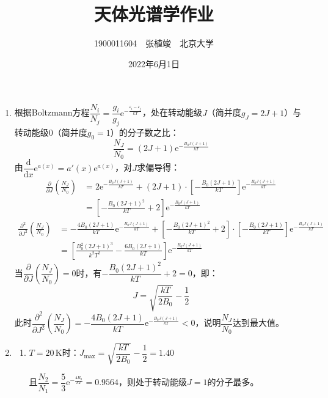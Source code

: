 \documentclass[a4paper]{article}
\renewcommand\epsilon\varepsilon
\begin{document}
\title{\textbf{天体光谱学作业}}
\author{1900011604\ \ 张植竣\ \ 北京大学}
\date{2022年6月1日}
\maketitle

\begin{enumerate}

    \item[1.]
    根据Boltzmann方程$\dfrac{N_i}{N_j} = \dfrac{g_i}{g_j} \mathrm{e}^{-\tfrac{\epsilon_i - \epsilon_j}{kT}}$，处在转动能级$J$（简并度$g_J=2J+1$）与转动能级$0$（简并度$g_0=1$）的分子数之比：
    \[
        \frac{N_J}{N_0} = (2J+1)\mathrm{e}^{-\tfrac{B_0 J(J+1)}{kT}}
    \]
    由$\dfrac{\mathrm{d}}{\mathrm{d}x}\mathrm{e}^{a(x)} = a'(x)\mathrm{e}^{a(x)}$，对$J$求偏导得：
    \begin{align*}
        \frac{\partial}{\partial J}\left(\frac{N_J}{N_0}\right)
        &= 2\mathrm{e}^{-\tfrac{B_0 J(J+1)}{kT}} + (2J+1) \cdot \left[-\frac{B_0(2J+1)}{kT}\right]\mathrm{e}^{-\tfrac{B_0 J(J+1)}{kT}} \\
        &= \left[-\frac{B_0(2J+1)^2}{kT} + 2\right]\mathrm{e}^{-\tfrac{B_0 J(J+1)}{kT}}
    \end{align*}
    \begin{align*}
        \frac{\partial^2}{\partial J^2}\left(\frac{N_J}{N_0}\right)
        &= -\frac{4B_0(2J+1)}{kT}\mathrm{e}^{-\tfrac{B_0 J(J+1)}{kT}} + \left[-\frac{B_0(2J+1)^2}{kT} + 2\right] \cdot \left[-\frac{B_0(2J+1)}{kT}\right]\mathrm{e}^{-\tfrac{B_0 J(J+1)}{kT}} \\
        &= \left[\frac{B_0 ^2 (2J+1)^3}{k^2 T^2} - \frac{6B_0(2J+1)}{kT}\right]\mathrm{e}^{-\tfrac{B_0 J(J+1)}{kT}}
    \end{align*}
    当$\dfrac{\partial}{\partial J}\left(\dfrac{N_J}{N_0}\right) = 0$时，有$-\dfrac{B_0(2J+1)^2}{kT} + 2 = 0$，即：
    \[
        J = \sqrt{\frac{kT}{2B_0}} - \frac{1}{2}
    \]
    此时$\dfrac{\partial^2}{\partial J^2}\left(\dfrac{N_J}{N_0}\right) = -\dfrac{4B_0(2J+1)}{kT}\mathrm{e}^{-\tfrac{B_0 J(J+1)}{kT}} < 0$，说明$\dfrac{N_J}{N_0}$达到最大值。

    \bigskip
    \item[2.]
    \begin{enumerate}
        \item[(a)]
        $T=20\,\mathrm{K}$时：$J_{\mathrm{max}} = \sqrt{\dfrac{kT}{2B_0}} -\dfrac{1}{2} = 1.40$

        且$\dfrac{N_2}{N_1} = \dfrac{5}{3}\mathrm{e}^{-\tfrac{4B_0}{kT}}=0.9564$，则处于转动能级$J = 1$的分子最多。
        

\end{enumerate}
\end{enumerate}
\end{document}
